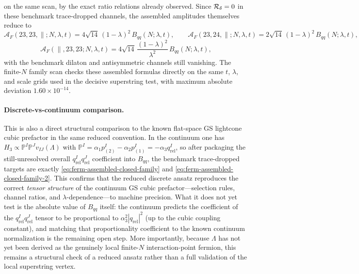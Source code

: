 \documentclass[11pt]{article}
\begin{document}
on the same scan, by the exact ratio relations already observed.
Since ${\cal R}_\delta=0$ in these benchmark trace-dropped channels, the
assembled amplitudes themselves reduce to
\begin{equation}
\mathcal{A}_F(23,23,\parallel;N,\lambda,t)
=
4\sqrt{14}\,(1-\lambda)^2\,B_{qq}(N;\lambda,t),
\qquad
\mathcal{A}_F(23,24,\parallel;N,\lambda,t)
=
2\sqrt{14}\,(1-\lambda)^2\,B_{qq}(N;\lambda,t),
\label{eq:ferm-assembled-closed-family}
\end{equation}
\begin{equation}
\mathcal{A}_F(\parallel,23,23;N,\lambda,t)
=
4\sqrt{14}\,\frac{(1-\lambda)^2}{\lambda^2}\,B_{qq}(N;\lambda,t),
\label{eq:ferm-assembled-closed-family-2}
\end{equation}
with the benchmark dilaton and antisymmetric channels still vanishing. The
finite-$N$ family scan checks these assembled formulas directly on the same
\(
t
\),
\(
\lambda
\),
and scale grids used in the decisive superstring test, with maximum absolute
deviation $1.60\times 10^{-14}$.
\paragraph{Discrete-vs-continuum comparison.}
This is also a direct structural comparison to the known flat-space GS
lightcone cubic prefactor in the same reduced convention. In the continuum one has
\(
H_3\propto \mathbb{P}^I\mathbb{P}^J v_{IJ}(\Lambda)
\)
with
\(
\mathbb{P}^I=\alpha_1 p_{(2)}^I-\alpha_2 p_{(1)}^I=-\alpha_3 q_{\mathrm{rel}}^I
\),
so after packaging the still-unresolved overall
$q_{\mathrm{rel}}^Iq_{\mathrm{rel}}^J$ coefficient into
$B_{qq}$, the benchmark trace-dropped targets are exactly
\eqref{eq:ferm-assembled-closed-family} and
\eqref{eq:ferm-assembled-closed-family-2}. This confirms that the reduced discrete ansatz reproduces the correct \emph{tensor structure} of the continuum GS cubic prefactor---selection rules, channel ratios, and $\lambda$-dependence---to machine precision. What it does not yet test is the absolute value of $B_{qq}$ itself: the continuum predicts the coefficient of the $q_{\mathrm{rel}}^Iq_{\mathrm{rel}}^J$ tensor to be proportional to $\alpha_3^2|q_{\mathrm{rel}}|^2$ (up to the cubic coupling constant), and matching that proportionality coefficient to the known continuum normalization is the remaining open step. More importantly, because $\Lambda$ has not yet been derived as the genuinely local finite-$N$ interaction-point fermion, this remains a structural check of a reduced ansatz rather than a full validation of the local superstring vertex.
\end{document}
